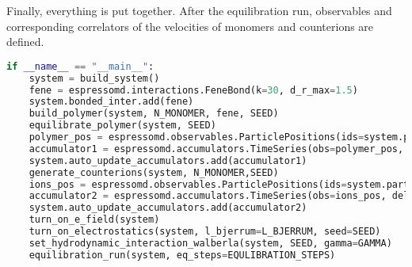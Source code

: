 Finally, everything is put together. After the equilibration run, observables and corresponding correlators of the velocities of monomers and counterions are defined.
\begin{lstlisting}[language=python]
if __name__ == "__main__":
	system = build_system()
	fene = espressomd.interactions.FeneBond(k=30, d_r_max=1.5)
	system.bonded_inter.add(fene)
	build_polymer(system, N_MONOMER, fene, SEED)
	equilibrate_polymer(system, SEED)
	polymer_pos = espressomd.observables.ParticlePositions(ids=system.part.select(type=0).id)
	accumulator1 = espressomd.accumulators.TimeSeries(obs=polymer_pos, delta_N=2)
	system.auto_update_accumulators.add(accumulator1)
	generate_counterions(system, N_MONOMER,SEED)
	ions_pos = espressomd.observables.ParticlePositions(ids=system.part.select(type=1).id)
	accumulator2 = espressomd.accumulators.TimeSeries(obs=ions_pos, delta_N=2)
	system.auto_update_accumulators.add(accumulator2)
	turn_on_e_field(system)
	turn_on_electrostatics(system, l_bjerrum=L_BJERRUM, seed=SEED)
	set_hydrodynamic_interaction_walberla(system, SEED, gamma=GAMMA)
	equilibration_run(system, eq_steps=EQULIBRATION_STEPS)
	

\end{lstlisting}
